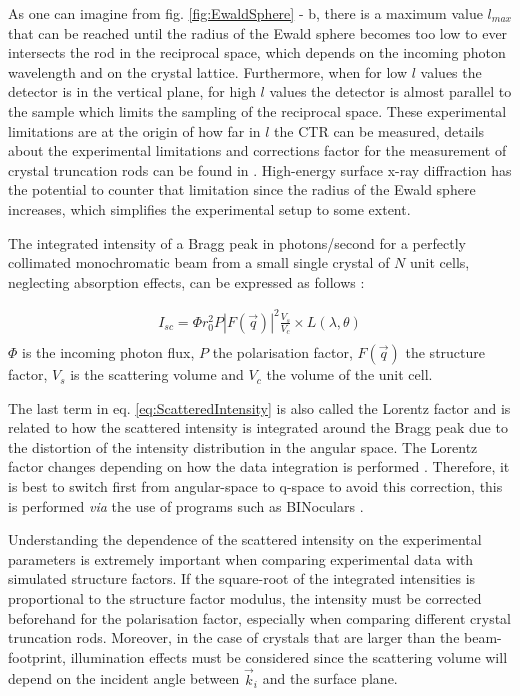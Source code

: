 As one can imagine from fig. \ref{fig:EwaldSphere} - b, there is a maximum value $l_{max}$ that can be reached until the radius of the Ewald sphere becomes too low to ever intersects the rod in the reciprocal space, which depends on the incoming photon wavelength and on the crystal lattice.
Furthermore, when for low $l$ values the detector is in the vertical plane, for high $l$ values the detector is almost parallel to the sample which limits the sampling of the reciprocal space.
These experimental limitations are at the origin of how far in $l$ the CTR can be measured, details about the experimental limitations and corrections factor for the measurement of crystal truncation rods can be found in \cite{Vlieg1997, Drnec2014}.
High-energy surface x-ray diffraction \parencite{Gustafson2014, Harlow2020, Hejral2021} has the potential to counter that limitation since the radius of the Ewald sphere increases, which simplifies the experimental setup to some extent.

The integrated intensity of a Bragg peak in photons/second for a perfectly collimated monochromatic beam from a small single crystal of $N$ unit cells, neglecting absorption effects, can be expressed as follows \parencite{NielsenMcMorrow}:

\begin{gather}
    \label{eq:ScatteredIntensity}
    I_{sc} = \Phi r_0^2 P |F(\vec{q})|^2 \frac{V_s}{V_c} \times L(\lambda, \theta)\\
\end{gather}
$\Phi$ is the incoming photon flux, $P$ the polarisation factor, $F(\vec{q})$ the structure factor, $V_s$ is the scattering volume and $V_c$ the volume of the unit cell.

The last term in eq. \ref{eq:ScatteredIntensity} is also called the Lorentz factor and is related to how the scattered intensity is integrated around the Bragg peak due to the distortion of the intensity distribution in the angular space.
The Lorentz factor changes depending on how the data integration is performed \parencite{Robach2000, Drnec2014}.
Therefore, it is best to switch first from angular-space to q-space to avoid this correction, this is performed \textit{via} the use of programs such as BINoculars \parencite{Roobol2015}.

Understanding the dependence of the scattered intensity on the experimental parameters is extremely important when comparing experimental data with simulated structure factors.
If the square-root of the integrated intensities is proportional to the structure factor modulus, the intensity must be corrected beforehand for the polarisation factor, especially when comparing different crystal truncation rods.
Moreover, in the case of crystals that are larger than the beam-footprint, illumination effects must be considered since the scattering volume will depend on the incident angle between $\vec{k}_i$ and the surface plane.

